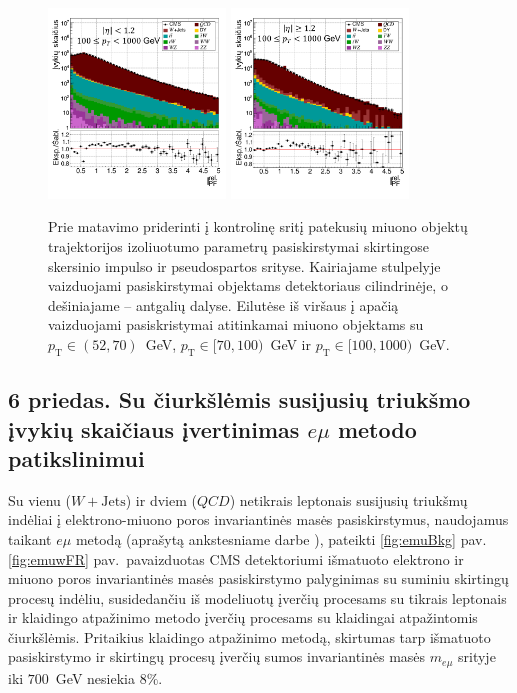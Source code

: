 \documentclass[a4paper, 12pt, oneside]{article}
\newcommand{\pT}{p_{\mathrm{T}}}
\newcommand{\emu}{e\mu}
\newcommand{\WJets}{W\! +\!\mathrm{Jets}}
\newcommand{\QCD}{QC\! D}
\begin{document}
\vspace{-1cm}
\begin{figure}[H]
	\includegraphics[width=0.42\textwidth]{Magistrinis/TFIT_ctrl_barrel_100to1000.png}
	\includegraphics[width=0.42\textwidth]{Magistrinis/TFIT_ctrl_endcap_100to1000.png}
	\vspace{-0.7cm}
	\caption{\label{fig:tFit_control}Prie matavimo priderinti į kontrolinę sritį patekusių miuono objektų trajektorijos izoliuotumo
	parametrų pasiskirstymai skirtingose skersinio impulso ir pseudospartos srityse.
	Kairiajame stulpelyje vaizduojami pasiskirstymai objektams detektoriaus cilindrinėje, o dešiniajame -- antgalių dalyse.
	Eilutėse iš viršaus į apačią vaizduojami pasiskristymai atitinkamai miuono objektams su $\pT\!\in\!(52,70)$~GeV,
	$\pT\!\in\![70,100)$~GeV ir $\pT\!\in\![100,1000)$~GeV.}
\end{figure}


\subsection*{6 priedas. Su čiurkšlėmis susijusių triukšmo įvykių skaičiaus įvertinimas $\emu$ metodo patikslinimui}
Su vienu ($\WJets$) ir dviem ($\QCD$) netikrais leptonais susijusių triukšmų indėliai į elektrono-miuono
poros invariantinės masės pasiskirstymus, naudojamus taikant $\emu$ metodą (aprašytą ankstesniame darbe \cite{MAbak}),
pateikti \ref{fig:emuBkg} pav.
\ref{fig:emuwFR} pav.\ pavaizduotas CMS detektoriumi išmatuoto elektrono ir miuono poros invariantinės masės pasiskirstymo
palyginimas su suminiu skirtingų procesų indėliu, susidedančiu iš modeliuotų įverčių procesams su tikrais leptonais ir 
klaidingo atpažinimo metodo įverčių procesams su klaidingai atpažintomis čiurkšlėmis.
Pritaikius klaidingo atpažinimo metodą, skirtumas tarp išmatuoto pasiskirstymo ir skirtingų procesų įverčių sumos invariantinės
masės $m_{\emu}$ srityje iki $700$~GeV nesiekia $8\%$.
\end{document}
